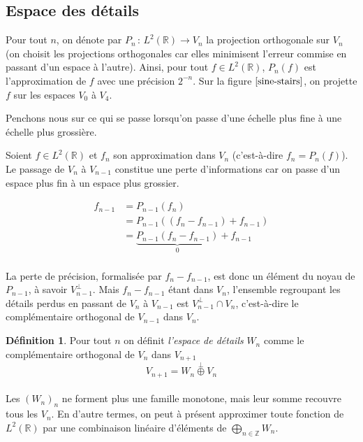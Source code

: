 \documentclass[]{article}
\theoremstyle{remark}
\theoremstyle{definition}
\newtheorem{mydef}{Définition}
\newcommand{\funcshort}[3]{
	#1 \, : \, #2 \longrightarrow #3
}
\newcommand{\DS}{\displaystyle}
\begin{document}
	\newpage
		
	\subsection{Espace des détails}
	
	Pour tout $n$, on dénote par $\funcshort{P_n}{L^2(\mathbb{R})}{V_n}$ la projection orthogonale sur $V_n$ (on choisit les projections orthogonales car elles minimisent l'erreur commise en passant d'un espace à l'autre). Ainsi, pour tout $f \in L^2(\mathbb{R})$, $P_n (f)$ est l'approximation de $f$ avec une précision $2^{-n}$. Sur la figure $\ref{sine-stairs}$, on projette $f$ sur les espaces $V_0$ à $V_4$.
	
	Penchons nous sur ce qui se passe lorsqu'on passe d'une échelle plus fine à une échelle plus grossière.
	
	Soient $f \in L^2(\mathbb{R})$ et $f_n$ son approximation dans $V_n$ (c'est-à-dire $f_n = P_n(f)$). Le passage de $V_n$ à $V_{n-1}$ constitue une perte d'informations car on passe d'un espace plus fin à un espace plus grossier.
	
	\begin{align*}
		f_{n-1} &= P_{n-1} (f_n) \\
		&= P_{n-1}( (f_n - f_{n-1}) + f_{n-1}) \\
		&= \underbrace{P_{n-1} (f_n - f_{n-1})}_{0} + f_{n-1} \\
	\end{align*}
	
	La perte de précision, formalisée par $f_n - f_{n-1}$, est donc un élément du noyau de $P_{n-1}$, à savoir $V_{n-1}^\bot$. Mais $f_n - f_{n-1}$ étant dans $V_{n}$, l'ensemble regroupant les détails perdus en passant de $V_n$ à $V_{n-1}$ est $V_{n-1}^\bot \cap V_n$, c'est-à-dire le complémentaire orthogonal de $V_{n-1}$ dans $V_n$.
	
	\begin{mydef}
		Pour tout $n$ on définit \textit{l'espace de détails} $W_{n}$ comme le complémentaire orthogonal de $V_{n}$ dans $V_{n+1}$ $$V_{n+1} = W_n \stackrel{\perp}{\oplus} V_n$$
	\end{mydef}
	
	\paragraph*{}
	Les $(W_n)_n$ ne forment plus une famille monotone, mais leur somme recouvre tous les $V_n$. En d'autre termes, on peut à présent approximer toute fonction de $L^2(\mathbb{R})$ par une combinaison linéaire d'éléments de $\DS \bigoplus_{n \in \mathbb{Z}} W_n$.
	
\end{document}

